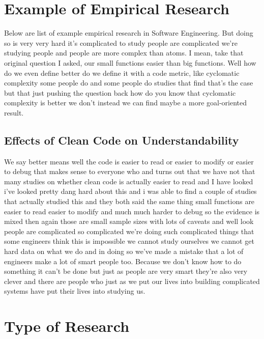 \documentclass[conference, compsoc, twoside]{IEEEtran}
\begin{document}


\section{Example of Empirical Research}
Below are list of example empirical research in Software Engineering.
But doing so is very very hard it's complicated to study people are complicated we're studying people and people are more complex than atoms.
I mean, take that original question I asked, our small functions easier than big functions.
Well how do we even define better do we define it with a code metric, like cyclomatic complexity some
people do and some people do studies that find that's the case but that just pushing the question back how do
you know that cyclomatic complexity is
better we don't instead we can find maybe a more goal-oriented result. 

\subsection{Effects of Clean Code on Understandability}

We say better means well the code is easier to read or easier to modify or easier to
debug that makes sense to everyone who
and turns out that we have not that many
studies on whether clean code is
actually easier to read and I have looked i've looked pretty dang hard
about this and i was able to find a
couple of studies that actually studied
this and they both said the same thing
small functions are easier to read
easier to modify and much much harder to
debug so the evidence is mixed then
again those are small sample sizes with
lots of caveats and well look people are
complicated so complicated we're doing
such complicated things that some
engineers think this is impossible we
cannot study ourselves we cannot get
hard data on what we do and in doing so we've made a mistake that a lot of engineers make a lot of smart people too.
Because we don't know how to do something it can't be done but just as people are very smart they're also very
clever and there are people who just as we put our lives into building
complicated systems have put their lives into studying us.
\section{Type of Research} %
\label{sec:type_of_research}

\end{document}
